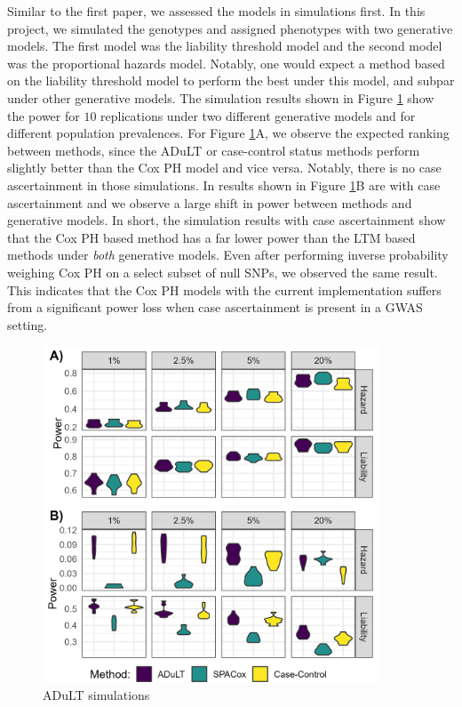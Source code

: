 Similar to the first paper, we assessed the models in simulations first. In this project, we simulated the genotypes and assigned phenotypes with two generative models. The first model was the liability threshold model and the second model was the proportional hazards model. Notably, one would expect a method based on the liability threshold model to perform the best under this model, and subpar under other generative models. The simulation results shown in Figure \ref{fig:adult_simulations} show the power for $ 10 $ replications under two different generative models and for different population prevalences. For Figure \ref{fig:adult_simulations}A, we observe the expected ranking between methods, since the ADuLT or case-control status methods perform slightly better than the Cox PH model and vice versa. Notably, there is no case ascertainment in those simulations. In results shown in Figure \ref{fig:adult_simulations}B are with case ascertainment and we observe a large shift in power between methods and generative models. In short, the simulation results with case ascertainment show that the Cox PH based method has a far lower power than the LTM based methods under \textit{both} generative models. Even after performing inverse probability weighing Cox PH on a select subset of null SNPs, we observed the same result. This indicates that the Cox PH models with the current implementation suffers from a significant power loss when case ascertainment is present in a GWAS setting.
\begin{figure}
	\label{fig:adult_simulations}
	\caption{ADuLT simulations}
	\includegraphics[width=10cm]{results/adult_combined_C250_power}
\end{figure}


